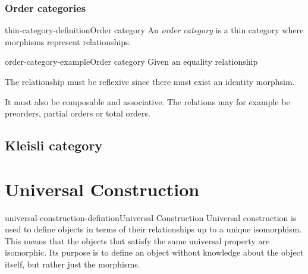 \documentclass[preview]{standalone}
\begin{document}
\subsubsection{Order categories}

\begin{snippetdefinition}{thin-category-definition}{Order category}
    An \textit{order category} is a thin category where morphisms represent relationships.
\end{snippetdefinition}

\begin{snippetexample}{order-category-example}{Order category}
    Given an equality relationship

    \begin{center}
    \end{center}

    The relationship must be reflexive since there must exist an identity morphsim.

    \begin{center}
    \end{center}

    It must also be composable and associative.
    The relations may for example be preorders, partial orders
    or total orders.
\end{snippetexample}

\subsection{Kleisli category}


\section{Universal Construction}

\begin{snippetdefinition}{universal-construction-defintion}{Universal Construction}
    Universal construction is used to define objects in terms of their
    relationships up to a unique isomorphism.
    This means that the objects that satisfy the same universal property
    are isomorphic.
    Its purpose is to define an object without knowledge about the object itself,
    but rather just the morphisms.
\end{snippetdefinition}
\end{document}

